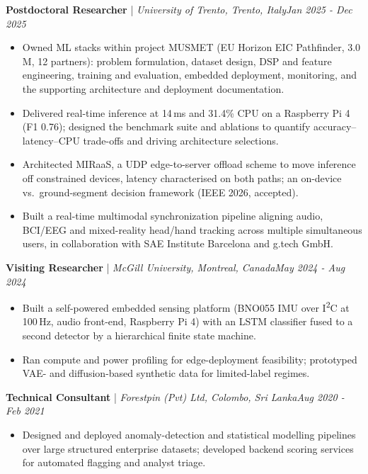 \documentclass[11pt]{article}
\newenvironment{cvrole}[5]{%
  \par\noindent\textbf{\large #1} | \textit{\small #2, #3}\hfill \textit{\small #4 - #5}\par
  \begin{itemize}[leftmargin=2em, itemsep=-0.3em, topsep=-0.5em]%
}{%
  \end{itemize}\par\noindent\mbox{}\par\vspace{0.1em}%
}
\begin{document}
\begin{cvrole}{Postdoctoral Researcher}{University of Trento}{Trento, Italy}{Jan 2025}{Dec 2025}
    \item Owned ML stacks within project {MUSMET} (EU Horizon EIC Pathfinder, \texteuro{}3.0\,M, 12 partners): problem formulation, dataset design, DSP and feature engineering, training and evaluation, embedded deployment, monitoring, and the supporting architecture and deployment documentation.
    \item Delivered real-time inference at {14\,ms and 31.4\% CPU on a Raspberry Pi 4} (F1 0.76); designed the benchmark suite and ablations to quantify accuracy--latency--CPU trade-offs and driving architecture selections.
    \item Architected {MIRaaS}, a UDP edge-to-server offload scheme to move inference off constrained devices, latency characterised on both paths; an on-device vs.\ ground-segment decision framework (IEEE 2026, accepted).
    \item Built a real-time multimodal synchronization pipeline aligning audio, BCI/EEG and mixed-reality head/hand tracking across multiple simultaneous users, in collaboration with SAE Institute Barcelona and g.tech GmbH.
\end{cvrole}
 
\begin{cvrole}{Visiting Researcher}{McGill University}{Montreal, Canada}{May 2024}{Aug 2024}
    \item Built a self-powered embedded sensing platform (BNO055 IMU over I\textsuperscript{2}C at 100\,Hz, audio front-end, Raspberry Pi 4) with an LSTM classifier fused to a second detector by a hierarchical finite state machine.
    \item Ran compute and power profiling for edge-deployment feasibility; prototyped VAE- and diffusion-based synthetic data for limited-label regimes.
\end{cvrole}
 
\begin{cvrole}{Technical Consultant}{Forestpin (Pvt) Ltd}{Colombo, Sri Lanka}{Aug 2020}{Feb 2021}
    \item Designed and deployed anomaly-detection and statistical modelling pipelines over large structured enterprise datasets; developed backend scoring services for automated flagging and analyst triage.
\end{cvrole}
 
\end{document}
